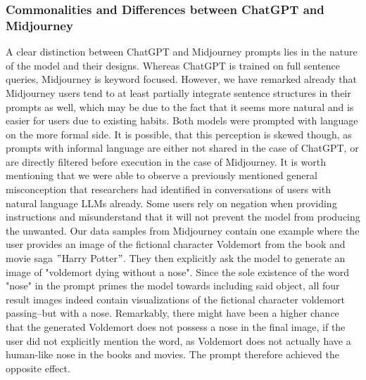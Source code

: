 \subsubsection{Commonalities and Differences between ChatGPT and Midjourney}
A clear distinction between ChatGPT and Midjourney prompts lies in the nature of the model and
their designs.
Whereas ChatGPT is trained on full sentence queries, Midjourney is keyword focused.
However, we have remarked already that Midjourney users tend to at least partially integrate
sentence structures in their prompts as well, which may be due to the fact that it seems more
natural and is easier for users due to existing habits.
Both models were prompted with language on the more formal side.
It is possible, that this perception is skewed though, as prompts with informal language are
either not shared in the case of ChatGPT, or are directly filtered before execution in the case
of Midjourney.
It is worth mentioning that we were able to observe a previously mentioned general misconception
that researchers had identified in conversations of users with natural language LLMs already.
Some users rely on negation when providing instructions and misunderstand that it will not
prevent the model from producing the unwanted.
Our data samples from Midjourney contain one example where the user provides an image of the
fictional character Voldemort from the book and movie saga \("\)Harry Potter\("\).
They then explicitly ask the model to
generate an image of "voldemort dying without a nose".
Since the sole existence of the word "nose" in the prompt primes the model towards including said
object, all four result images indeed contain visualizations of the fictional character voldemort
passing--but with a nose.
Remarkably, there might have been a higher chance that the generated Voldemort does not possess a nose in the final image,
if the user did not explicitly mention the word, as
Voldemort does not actually have a human-like nose in the books and movies.
The prompt therefore achieved the opposite effect.
